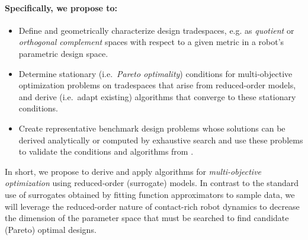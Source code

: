 \documentclass[11pt]{article}
\begin{document}
\paragraph{Specifically, we propose to:}
\begin{itemize}[leftmargin=1.5cm]
    \item[\T{2.1}] Define and geometrically characterize design tradespaces, e.g. as \emph{quotient} or \emph{orthogonal complement} spaces with respect to a given metric in a robot's parametric design space.
    \item[\T{2.2}] Determine stationary (i.e.\ \emph{Pareto optimality}) conditions for multi-objective optimization problems on tradespaces that arise from reduced-order models, and derive (i.e.\ adapt existing) algorithms that converge to these stationary conditions. 
    \item[\T{2.3}] Create representative benchmark design problems whose solutions can be derived analytically or computed by exhaustive search and use these problems to validate the conditions and algorithms from .
\end{itemize}

\noindent
In short, we propose to derive and apply algorithms for \emph{multi-objective optimization} using reduced-order (surrogate) models.
In contrast to the standard use of surrogates obtained by fitting function approximators to sample data, we will leverage the reduced-order nature of contact-rich robot dynamics to decrease the dimension of the parameter space that must be searched to find candidate (Pareto) optimal designs.


\end{document}
